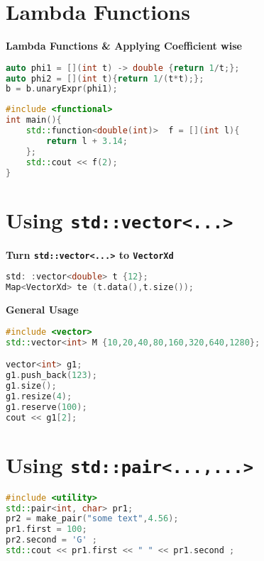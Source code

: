 \documentclass{sciposter}
\newcommand{\psection}[1]{\par \textbf{\large#1}}
\begin{document}
\begin{multicols}{2}
\section*{Lambda Functions}
\psection{Lambda Functions \& Applying Coefficient wise}
\begin{lstlisting}[language=C++]
auto phi1 = [](int t) -> double {return 1/t;};
auto phi2 = [](int t){return 1/(t*t);};
b = b.unaryExpr(phi1);
\end{lstlisting}


\begin{lstlisting}[language=c++]
#include <functional>
int main(){
	std::function<double(int)>  f = [](int l){
		return l + 3.14;
	};
	std::cout << f(2);
}
\end{lstlisting}





\section*{Using \texttt{std::vector<...>}}


\psection{Turn \texttt{std::vector<...>} to \texttt{VectorXd}}

\begin{lstlisting}[language=c++]
std: :vector<double> t {12};
Map<VectorXd> te (t.data(),t.size());
\end{lstlisting}

\psection{General Usage}

\begin{lstlisting}[language=c++]
#include <vector>
std::vector<int> M {10,20,40,80,160,320,640,1280};

vector<int> g1; 
g1.push_back(123); 
g1.size(); 
g1.resize(4); 
g1.reserve(100);
cout << g1[2];
\end{lstlisting}



\section*{Using \texttt{std::pair<...,...>}}
\begin{lstlisting}[language=c++]
#include <utility>
std::pair<int, char> pr1; 
pr2 = make_pair("some text",4.56); 
pr1.first = 100; 
pr2.second = 'G' ; 
std::cout << pr1.first << " " << pr1.second ; 
\end{lstlisting}






\end{multicols}
\end{document}
